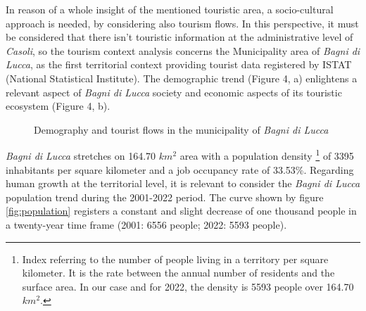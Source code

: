 \documentclass[sustainability,article,submit,pdftex,moreauthors]{Definitions/mdpi}
\begin{document}
In reason of a whole insight of the mentioned touristic area, a socio-cultural approach is needed, by considering also tourism flows. In this perspective, it must be considered that there isn’t touristic information at the administrative level of \emph{Casoli}, so the tourism context analysis concerns the Municipality area of \emph{Bagni di Lucca}, as the first territorial context providing tourist data registered by ISTAT (National Statistical Institute).
 The demographic trend (Figure 4, a) enlightens a relevant aspect of \emph{Bagni di Lucca} society and economic aspects of its touristic ecosystem (Figure 4, b).

\begin{figure}
\hfill
{}
\caption{Demography and tourist flows in the municipality of \emph{Bagni di Lucca}}
\end{figure}


\emph{Bagni di Lucca} stretches on 164.70 $km^2$ area with a population density \footnote{Index referring to the number of people living in a territory per square kilometer. It is the rate between the annual number of residents and the surface area. In our case and for 2022, the density is 5593 people over 164.70 $km^2$.} of 3395 inhabitants per square kilometer and a job occupancy rate of 33.53\%. Regarding human growth at the territorial level, it is relevant to consider the \emph{Bagni di Lucca} population trend during the 2001-2022 period. The curve shown by figure \ref{fig:population} registers a constant and slight decrease of one thousand people in a twenty-year time frame (2001: 6556 people; 2022: 5593 people). 
\end{document}
